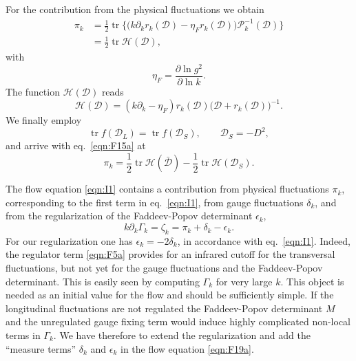 \documentclass[twocolumn,aps,prd,amsmath,amssymb,preprintnumbers,longbibliography]{revtex4-1}
\numberwithin{equation}{section}
\DeclareMathOperator{\tr}{tr}
\newenvironment{alignedeqn}{\begin{equation}\begin{aligned}}{\end{aligned}\end{equation}\ignorespacesafterend}
\begin{document}
For the contribution from the physical fluctuations we obtain
\begin{alignedeqn}\label{eqn:F20a}
	\pi_k
	&= \frac{1}{2}\tr\bigl\{\bigl(k\partial_k r_k(\mathcal{D}) - \eta_Fr_k(\mathcal{D})\bigr)\mathcal{P}^{-1}_k(\mathcal{D})\bigr\}\\
	&= \frac{1}{2}\tr\mathcal{H}(\mathcal{D}),
\end{alignedeqn}
with
\begin{equation}\label{eqn:F21a}
	\eta_F
	= \frac{\partial\ln g^2}{\partial\ln k}.
\end{equation}
The function $\mathcal{H}(\mathcal{D})$ reads
\begin{equation}\label{eqn:400A}
	\mathcal{H}(\mathcal{D})
	= (k\partial_k - \eta_F)r_k(\mathcal{D})\bigl(\mathcal{D} + r_k(\mathcal{D})\bigr)^{-1}.
\end{equation}
We finally employ
\begin{equation}\label{eqn:F22a}
	\tr f(\mathcal{D}_L)
	= \tr f(\mathcal{D}_S),
	\qquad
	\mathcal{D}_S
	= -D^2,
\end{equation}
and arrive with eq.~\eqref{eqn:F15a} at
\begin{equation}\label{eqn:F23a}
	\pi_k
	= \frac{1}{2} \tr\mathcal{H}(\bar{\mathcal{D}}) - \frac{1}{2}\tr\mathcal{H}(\mathcal{D}_S).
\end{equation}

The flow equation \eqref{eqn:I1} contains a contribution from physical fluctuations $\pi_k$, corresponding to the first term in eq.~\eqref{eqn:I1}, from gauge fluctuations $\delta_k$, and from the regularization of the Faddeev-Popov determinant $\epsilon_k$,
\begin{equation}\label{eqn:F19a}
	k \partial_k \Gamma_k
	= \zeta_k
	= \pi_k + \delta_k - \epsilon_k.
\end{equation}
For our regularization one has $\epsilon_k = -2 \delta_k$, in accordance with eq.~\eqref{eqn:I1}. Indeed, the regulator term \eqref{eqn:F5a} provides for an infrared cutoff for the transversal fluctuations, but not yet for the gauge fluctuations and the Faddeev-Popov determinant. This is easily seen by computing $\Gamma_k$ for very large $k$. This object is needed as an initial value for the flow and should be sufficiently simple. If the longitudinal fluctuations are not regulated the Faddeev-Popov determinant $M$ and the unregulated gauge fixing term would induce highly complicated non-local terms in $\Gamma_k$. We have therefore to extend the regularization and add the ``measure terms'' $\delta_k$ and $\epsilon_k$ in the flow equation \eqref{eqn:F19a}.
\end{document}
